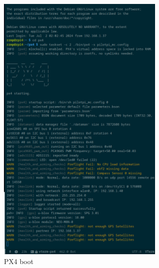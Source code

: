 \begin{figure}[htb!]
  \centering
  \begin{subfigure}[t]{.48\textwidth}
    \includegraphics[width=0.89\textwidth]{./img/png/px4-qgc-cam-2}
    \caption{PX4 boot}%
    \label{fig:px4-qgc-cam-2}
  \end{subfigure}
  \begin{subfigure}[t]{.48\textwidth}

\end{subfigure}
\end{figure}
